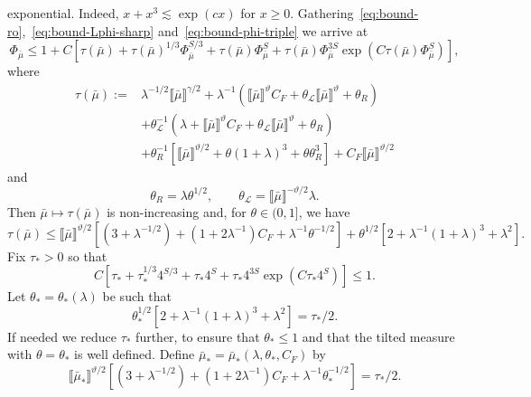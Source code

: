 \documentclass{article}
\numberwithin{equation}{section}
\newcommand{\assign}{:=}
\theoremstyle{plain}
\theoremstyle{definition}
\begin{document}
exponential. Indeed, $x + x^3 \lesssim \exp (c x)$ for $x \geqslant 0$.
Gathering~\eqref{eq:bound-ro},~\eqref{eq:bound-Lphi-sharp}
and~\eqref{eq:bound-phi-triple} we arrive at
\begin{equation}
  \Phi_{\bar{\mu}} \leqslant 1 + C [\tau (\bar{\mu}) + \tau (\bar{\mu})^{1 /
  3} \Phi_{\bar{\mu}}^{S / 3} + \tau (\bar{\mu}) \Phi_{\bar{\mu}}^S + \tau
  (\bar{\mu}) \Phi_{\bar{\mu}}^{3S} \exp (C \tau (\bar{\mu})
  \Phi_{\bar{\mu}}^S)], \label{eq:bound-Phi-O}
\end{equation}
where
\[ \begin{aligned}
     \tau (\bar{\mu}) \assign & \lambda^{- 1 / 2}  \llbracket \bar{\mu}
     \rrbracket^{\gamma / 2} + \lambda^{- 1} (\llbracket \bar{\mu}
     \rrbracket^{\vartheta} C_F + \theta_{\mathcal{L}} \llbracket \bar{\mu}
     \rrbracket^{\vartheta} + \theta_R)\\
     &   + \theta_{\mathcal{L}}^{- 1} (\lambda
     + \llbracket \bar{\mu} \rrbracket^{\vartheta} C_F + \theta_{\mathcal{L}}
     \llbracket \bar{\mu} \rrbracket^{\vartheta} + \theta_R)\\
     &   + \theta_R^{- 1} [\llbracket \bar{\mu} \rrbracket^{\vartheta / 2} +
     \theta (1 + \lambda)^3 + \theta \theta_R^3]
     + C_F \llbracket \bar{\mu} \rrbracket^{\vartheta / 2} 
   \end{aligned} \]
and
\begin{equation}
  \theta_R = \lambda \theta^{1 / 2}, \qquad \theta_{\mathcal{L}} = \llbracket
  \bar{\mu} \rrbracket^{- \vartheta / 2} \lambda .
  \label{eq:choice-theta-LR-O}
\end{equation}
Then $\bar{\mu} \mapsto \tau (\bar{\mu})$ is non-increasing
and, for $\theta \in (0, 1]$, we have
\[ \tau (\bar{\mu}) \leqslant \llbracket \bar{\mu} \rrbracket^{\vartheta / 2}
   [(3 + \lambda^{- 1 / 2}) + (1 + 2 \lambda^{- 1}) C_F + \lambda^{- 1}
   \theta^{- 1 / 2}] + \theta^{1 / 2} [2 + \lambda^{- 1} (1 + \lambda)^3 +
   \lambda^2] . \]
Fix $\tau_{\ast} > 0$ so that
\[ C [\tau_{\ast} + \tau_{\ast}^{1 / 3} 4^{S / 3} + \tau_{\ast} 4^S +
   \tau_{\ast} 4^{3S} \exp (C \tau_{\ast} 4^S)] \leqslant 1. \]
Let $\theta_{\ast} = \theta_{\ast} (\lambda)$ be such that
\[ \theta_{\ast}^{1 / 2} [2 + \lambda^{- 1} (1 + \lambda)^3 + \lambda^2] =
   \tau_{\ast} / 2. \]
If needed we reduce $\tau_\ast$ further, to ensure that $\theta_\ast \leqslant
1$ and that the tilted measure with $\theta = \theta_\ast$ is well defined.
Define $\bar{\mu}_{\ast} = \bar{\mu}_{\ast} (\lambda, \theta_{\ast}, C_F)$
by
\[ \llbracket \bar{\mu}_{\ast} \rrbracket^{\vartheta / 2} [(3 + \lambda^{- 1 /
   2}) + (1 + 2 \lambda^{- 1}) C_F + \lambda^{- 1} \theta_{\ast}^{- 1 / 2}] =
   \tau_{\ast} / 2. \]
\end{document}
